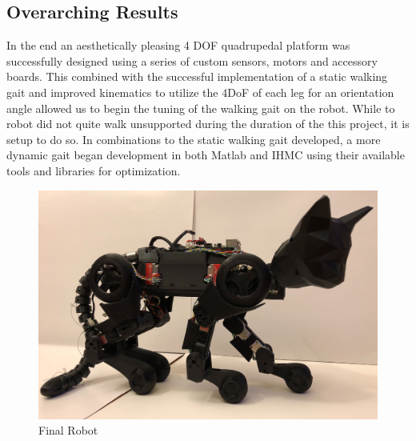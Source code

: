 \subsection{Overarching Results}
In the end an aesthetically pleasing 4 DOF quadrupedal platform was successfully designed using a series of custom sensors, motors and accessory boards. This combined with the successful implementation of a static walking gait and improved kinematics to utilize the 4DoF of each leg for an orientation angle allowed us to begin the tuning of the walking gait on the robot. While to robot did not quite walk unsupported during the duration of the this project, it is  setup to do so. In combinations to the static walking gait developed, a more dynamic gait began development in both Matlab and IHMC using their available tools and libraries for optimization.
\begin{figure}[H]
            \centering
            \includegraphics[width=120mm]{figures/FinalRobot.jpg}
            \caption{Final Robot}
            \label{fig:FinalRobot}
\end{figure}

